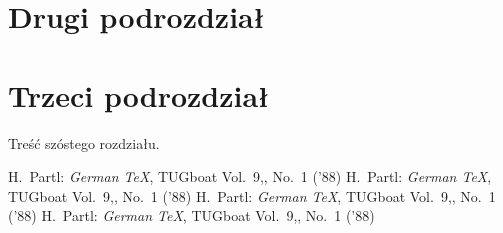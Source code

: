\documentclass[12pt,a4paper,titlepage]{report}
\begin{document}
\section{Drugi podrozdział}
\section{Trzeci podrozdział}
Treść szóstego rozdziału.
\newpage
\begin{thebibliography}{99}
 H.~Partl:
\emph{German \TeX},
TUGboat Vol.~9,, No.~1 ('88)
 H.~Partl:
\emph{German \TeX},
TUGboat Vol.~9,, No.~1 ('88)
 H.~Partl:
\emph{German \TeX},
TUGboat Vol.~9,, No.~1 ('88)
 H.~Partl:
\emph{German \TeX},
TUGboat Vol.~9,, No.~1 ('88)
\end{thebibliography}
\end{document}
